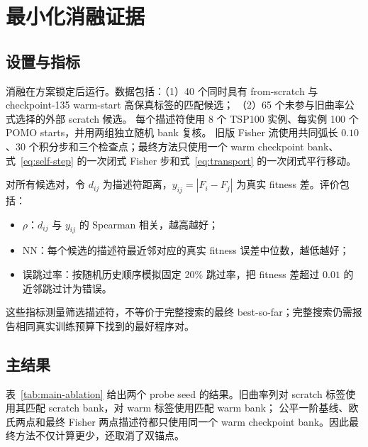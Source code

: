 \documentclass[UTF8,11pt]{ctexart}
\begin{document}
\section{最小化消融证据}

\subsection{设置与指标}

消融在方案锁定后运行。数据包括：（1）40 个同时具有 from-scratch 与 checkpoint-135 warm-start 高保真标签的匹配候选；
（2）65 个未参与旧曲率公式选择的外部 scratch 候选。
每个描述符使用 8 个 TSP100 实例、每实例 100 个 POMO starts，并用两组独立随机 bank 复核。
旧版 Fisher 流使用共同弧长 $0.10$、30 个积分步和三个检查点；最终方法只使用一个 warm checkpoint bank、式~\eqref{eq:self-step} 的一次闭式 Fisher 步和式~\eqref{eq:transport} 的一次闭式平行移动。

对所有候选对，令 $d_{ij}$ 为描述符距离，$y_{ij}=|F_i-F_j|$ 为真实 fitness 差。评价包括：
\begin{itemize}
  \item $\rho$：$d_{ij}$ 与 $y_{ij}$ 的 Spearman 相关，越高越好；
  \item NN：每个候选的描述符最近邻对应的真实 fitness 误差中位数，越低越好；
  \item 误跳过率：按随机历史顺序模拟固定 20\% 跳过率，把 fitness 差超过 $0.01$ 的近邻跳过计为错误。
\end{itemize}

这些指标测量筛选描述符，不等价于完整搜索的最终 best-so-far；完整搜索仍需报告相同真实训练预算下找到的最好程序对。

\subsection{主结果}

表~\ref{tab:main-ablation} 给出两个 probe seed 的结果。旧曲率列对 scratch 标签使用其匹配 scratch bank，对 warm 标签使用匹配 warm bank；
公平一阶基线、欧氏两点和最终 Fisher 两点描述符都只使用同一个 warm checkpoint bank。因此最终方法不仅计算更少，还取消了双锚点。
\end{document}
